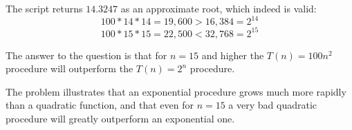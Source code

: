 \documentclass[a4paper,12pt]{article}
\begin{document}
The script returns $14.3247$ as an approximate root, which indeed is valid:
\[ 100 * 14 * 14 = 19,600 > 16,384 = 2^{14} \]
\[ 100 * 15 * 15 = 22,500 < 32,768 = 2^{15} \]

The answer to the question is that for $n=15$ and higher the $T(n) = 100n^2$ procedure will 
outperform the $T(n) = 2^n$ procedure. 

The problem illustrates that an exponential procedure 
grows much more rapidly than a quadratic function, 
and that even for $n = 15$ a very bad quadratic procedure will greatly outperform an exponential one.
\end{document}

